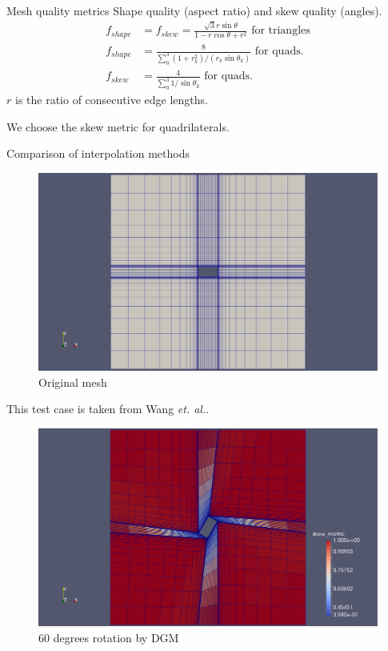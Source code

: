 \documentclass[t,12pt]{beamer}
\begin{document}
\begin{frame}{Mesh quality metrics}
Shape quality (aspect ratio) and skew quality (angles).
\begin{align}
f_{shape} &= f_{skew} = \frac{\sqrt{3}r\sin\theta}{1-r\cos\theta+r^2} \text{ for triangles} \\
f_{shape} &= \frac{8}{\sum_0^3(1+r_k^2)/(r_k\sin\theta_k)} \text{ for quads.} \\
f_{skew} &= \frac{4}{\sum_0^3 1/\sin\theta_k} \text{ for quads.}
\end{align}
$r$ is the ratio of consecutive edge lengths.

We choose the skew metric for quadrilaterals.
\end{frame}

\begin{frame}{Comparison of interpolation methods}
 \begin{figure}
 	\centering
 	\includegraphics[scale=0.15]{qin-orig-mesh.pdf}
 	\caption{Original mesh}
 	\label{fig:qin-orig}
 \end{figure}
 This test case is taken from Wang \emph{et. al.}.
\end{frame}
\begin{frame}
	 \begin{figure}
	 	\centering
	 	\includegraphics[scale=0.2]{qin-60-dgm-quality.pdf}
	 	\caption{60 degrees rotation by DGM}
	 	\label{fig:qin-60-dgm}
	 \end{figure}
\end{frame}
\end{document}
